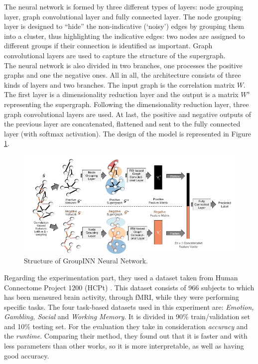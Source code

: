 The neural network is formed by three different types of layers: node grouping layer, graph convolutional layer and fully connected layer. The node grouping layer is designed to “hide” the non-indicative (‘noisy’) edges by grouping them into a cluster, thus highlighting the indicative edges: two nodes are assigned to different groups if their connection is identified as important.
Graph convolutional layers are used to capture the structure of the supergraph.
\\

The neural network is also divided in two branches, one processes the positive graphs and one the negative ones. 
All in all, the architecture consists of three kinds of layers and two branches. 
The input graph is the correlation matrix $W$. The first layer is a dimensionality reduction layer and the output is a matrix $W^{s}$ representing the supergraph. Following the dimensionality reduction layer, three graph convolutional layers are used. At last, the positive and negative outputs of the previous layer are concatenated, flattened and sent to the fully connected layer (with softmax activation). The design of the model is represented in Figure \ref{fig:diagram5}.

\begin{figure}[htbp]
	\centering
	\includegraphics[scale=0.65]{Immagini/Groupinn1.PNG}
	\caption{Structure of GroupINN Neural Network.}
	\label{fig:diagram5}
\end{figure}

Regarding the experimentation part, they used a dataset taken from Human Connectome Project 1200 (HCPt) \cite{hcp}. 
This dataset consists of 966 subjects to which has been measured brain activity, through fMRI, while they were performing specific tasks. The four task-based datasets used in this experiment are: \textit{Emotion, Gambling, Social} and \textit{Working Memory}. It is divided in 90\% train/validation set and 10\% testing set. For the evaluation they take in consideration \textit{accuracy} and the \textit{runtime}. Comparing their method, they found out that it is faster and with less parameters than other works, so it is more interpretable, as well as having good accuracy.
\\

